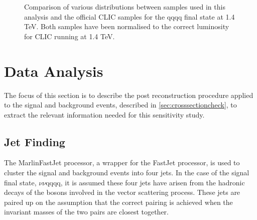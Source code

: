 \begin{figure}
\centering
{}
\caption[Comparison of various distributions between samples used in this analysis and the official CLIC samples for the \nu{\nu}qqqq final state at 1.4 TeV.]{Comparison of various distributions between samples used in this analysis and the official CLIC samples for the \nu{\nu}qqqq final state at 1.4 TeV.  Both samples have been normalised to the correct luminosity for CLIC running at 1.4 TeV.}
\label{fig:cliccomp}
\end{figure}

\section{Data Analysis}
\label{sec:dataanalysis}
The focus of this section is to describe the post reconstruction procedure applied to the signal and background events, described in \ref{sec:crosssectioncheck}, to extract the relevant information needed for this sensitivity study. 

\subsection{Jet Finding} 
\label{sec:jetpairing}
The MarlinFastJet processor, a wrapper for the FastJet \cite{Cacciari:2011ma} processor, is used to cluster the signal and background events into four jets.  In the case of the signal final state, $\nu\nu$qqqq, it is assumed these four jets have arisen from the hadronic decays of the bosons involved in the vector scattering process.  These jets are paired up on the assumption that the correct pairing is achieved when the invariant masses of the two pairs are closest together. 

